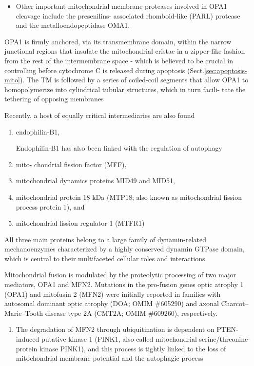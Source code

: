 \begin{itemize}
\begin{itemize}
    \item  Other important mitochondrial membrane proteases involved in OPA1
    cleavage include the presenilins- associated rhomboid-like (PARL) protease
    and the metalloendopeptidase OMA1.
  \end{itemize}

  
  OPA1 is firmly anchored, via its transmembrane domain, within the narrow
  junctional regions that insulate the mitochondrial cristae in a zipper-like
  fashion from the rest of the intermembrane space - which is believed to be
  crucial in controlling before cytochrome C is released during apoptosis
  (Sect.\ref{sec:apoptosis-mito}). The TM is followed by a series of coiled-coil
  segments that allow OPA1 to homopolymerize into cylindrical tubular
  structures, which in turn facili- tate the tethering of opposing membranes
  
\end{itemize}
Recently,  a host of equally critical intermediaries are also found
\begin{enumerate}
  
  \item endophilin-B1, 
  
  Endophilin-B1 has also been linked with the regulation of autophagy
  
  \item mito- chondrial fission factor (MFF), 
  
  \item mitochondrial dynamics proteins MID49 and MID51, 
  
  \item mitochondrial protein 18 kDa (MTP18; also known as mitochondrial fission process protein 1), and 
  
  \item mitochondrial fission regulator 1 (MTFR1)
\end{enumerate}

All three main proteins belong to a large family of dynamin-related mechanoenzymes
characterized by a highly conserved dynamin GTPase domain, which is central to
their multifaceted cellular roles and interactions.

Mitochondrial fusion is modulated by the proteolytic processing of two major mediators, OPA1 and MFN2.
Mutations in the pro-fusion genes optic atrophy 1 (OPA1) and mitofusin 2 (MFN2)
were initially reported in families with autosomal dominant optic atrophy (DOA;
OMIM \#605290) and axonal Charcot–Marie–Tooth disease type 2A (CMT2A; OMIM
\#609260), respectively.
\begin{enumerate}

  \item The degradation of MFN2 through ubiquitination is dependent on
  PTEN-induced putative kinase 1 (PINK1, also called mitochondrial
  serine/threonine-protein kinase PINK1), and this process is tightly linked to
  the loss of mitochondrial membrane potential and the autophagic process

  
\end{enumerate}


